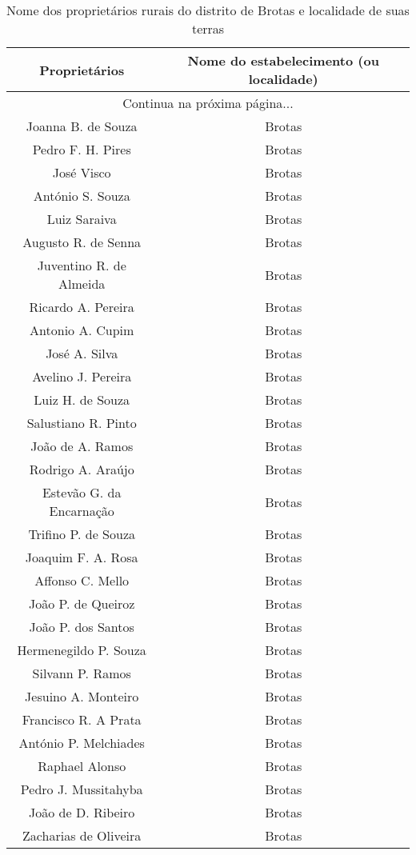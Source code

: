 \begin{tiny}
\begin{longtable}{cc}
\caption{Nome dos proprietários rurais do distrito de Brotas e localidade de suas terras}\label{tab:proprurais}\\
\hline Proprietários & Nome do estabelecimento (ou localidade) \\ \hline\hline \endhead
\hline \multicolumn{2}{c}{Continua na próxima página...} \\ \endfoot
\hline \endlastfoot
Joanna B. de Souza  & Brotas \\
Pedro F. H. Pires  & Brotas \\
José Visco  & Brotas \\
António S. Souza  & Brotas \\
Luiz Saraiva  & Brotas \\
Augusto R. de Senna  & Brotas \\
Juventino R. de Almeida  & Brotas \\
Ricardo A. Pereira  & Brotas \\
Antonio A. Cupim & Brotas \\
José A. Silva & Brotas \\
Avelino J. Pereira & Brotas \\
Luiz H. de Souza & Brotas \\
Salustiano R. Pinto & Brotas \\
João de A. Ramos & Brotas \\
Rodrigo A. Araújo & Brotas \\
Estevão G. da Encarnação & Brotas \\
Trifino P. de Souza & Brotas \\
Joaquim F. A. Rosa & Brotas \\
Affonso C. Mello & Brotas \\
João P. de Queiroz & Brotas \\
João P. dos Santos & Brotas \\
Hermenegildo P. Souza & Brotas \\
Silvann P. Ramos & Brotas \\
Jesuino A. Monteiro & Brotas \\
Francisco R. A Prata & Brotas \\
António P. Melchiades & Brotas \\
Raphael Alonso & Brotas \\
Pedro J. Mussitahyba & Brotas \\
João de D. Ribeiro & Brotas \\
Zacharias de Oliveira & Brotas \\

\end{longtable}
\end{tiny}
